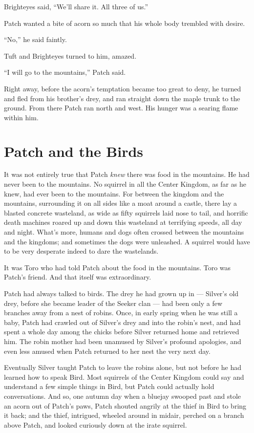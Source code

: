 \documentclass[ebook,oneside,openany,12pt]{memoir}
\begin{document}
Brighteyes said, “We’ll share it. All three of us.”

Patch wanted a bite of acorn so much that his whole body trembled with
desire.

“No,” he said faintly.

Tuft and Brighteyes turned to him, amazed.

“I will go to the mountains,” Patch said.

Right away, before the acorn’s temptation became too great to deny, he
turned and fled from his brother’s drey, and ran straight down the
maple trunk to the ground. From there Patch ran north and west. His
hunger was a searing flame within him.


\section{Patch and the Birds}

It was not entirely true that Patch \emph{knew} there was food in
the mountains. He had never been to the mountains. No squirrel in all
the Center Kingdom, as far as he knew, had ever been to the
mountains. For between the kingdom and the mountains, surrounding it
on all sides like a moat around a castle, there lay a blasted concrete
wasteland, as wide as fifty squirrels laid nose to tail, and horrific
death machines roared up and down this wasteland at terrifying speeds,
all day and night. What’s more, humans and dogs often crossed between
the mountains and the kingdoms; and sometimes the dogs were
unleashed. A squirrel would have to be very desperate indeed to dare
the wastelands.

It was Toro who had told Patch about the food in the mountains. Toro
was Patch’s friend. And that itself was extraordinary.

Patch had always talked to birds. The drey he had grown up in —
Silver’s old drey, before she became leader of the Seeker clan — had
been only a few branches away from a nest of robins. Once, in early
spring when he was still a baby, Patch had crawled out of Silver’s
drey and into the robin’s nest, and had spent a whole day among the
chicks before Silver returned home and retrieved him. The robin mother
had been unamused by Silver’s profound apologies, and even less amused
when Patch returned to her nest the very next day.

Eventually Silver taught Patch to leave the robins alone, but not
before he had learned how to speak Bird. Most squirrels of the Center
Kingdom could say and understand a few simple things in Bird, but
Patch could actually hold conversations. And so, one autumn day when a
bluejay swooped past and stole an acorn out of Patch’s paws, Patch
shouted angrily at the thief in Bird to bring it back; and the thief,
intrigued, wheeled around in midair, perched on a branch above Patch,
and looked curiously down at the irate squirrel.
\end{document}
